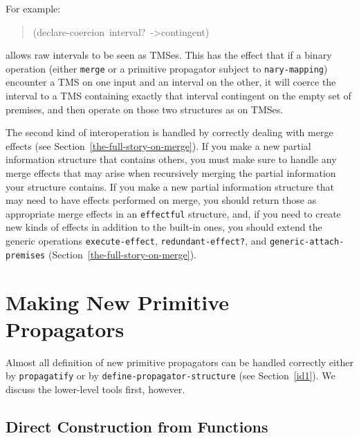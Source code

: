 \documentclass[12pt,letterpaper,english]{article}
\begin{document}
For example:
\begin{quote}{\ttfamily \raggedright \noindent
(declare-coercion~interval?~->contingent)
}\end{quote}
allows raw intervals to be seen as TMSes.  This has the effect that if
a binary operation (either \texttt{merge} or a primitive propagator subject
to \texttt{nary-mapping}) encounter a TMS on one input and an interval on
the other, it will coerce the interval to a TMS containing exactly
that interval contingent on the empty set of premises, and then
operate on those two structures as on TMSes.

The second kind of interoperation is handled by correctly dealing with
merge effects (see Section~\ref{the-full-story-on-merge}).
If you make a new partial information
structure that contains others, you must make sure to handle any merge
effects that may arise when recursively merging the partial
information your structure contains.  If you make a new partial
information structure that may need to have effects performed on
merge, you should return those as appropriate merge effects in an
\texttt{effectful} structure, and, if you need to create new kinds of
effects in addition to the built-in ones, you should extend the
generic operations \texttt{execute-effect}, \texttt{redundant-effect?}, and
\texttt{generic-attach-premises} (Section~\ref{the-full-story-on-merge}).



\hypertarget{making-new-primitive-propagators}{}
\section{Making New Primitive Propagators}
\label{making-new-primitive-propagators}

Almost all definition of new primitive propagators can be handled
correctly either by \texttt{propagatify} or by
\texttt{define-propagator-structure} (see Section~\ref{id1}).
We discuss the
lower-level tools first, however.



\hypertarget{direct-construction-from-functions}{}
\subsection{Direct Construction from Functions}
\label{direct-construction-from-functions}
\end{document}
